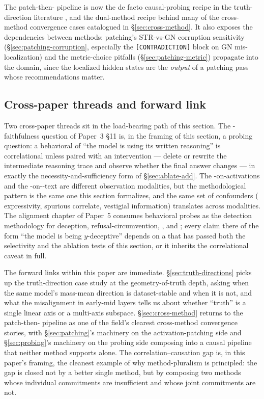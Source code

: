 The patch-then- pipeline is now the de facto causal-probing
recipe in the truth-direction literature
\citep{marks-tegmark-2023-truth}, and the dual-method recipe behind
many of the cross-method convergence cases catalogued in
\S\ref{sec:cross-method}. It also exposes the dependencies between
methods: patching's STR-vs-GN corruption sensitivity
(\S\ref{sec:patching-corruption}, especially the
\texttt{[CONTRADICTION]} block on GN mis-localization) and the
metric-choice pitfalls (\S\ref{sec:patching-metric}) propagate into
the  domain, since the localized hidden states are the
\emph{output} of a patching pass whose recommendations matter.

\subsection{Cross-paper threads and forward link}
\label{sec:correlation-causation-forward}

Two cross-paper threads sit in the load-bearing path of this section.
The -faithfulness question of Paper~3 \S 11 is, in
the framing of this section, a probing question: a behavioral 
of ``the model is using its written reasoning'' is correlational
unless paired with an intervention --- delete or rewrite the
intermediate reasoning trace and observe whether the final answer
changes --- in exactly the necessity-and-sufficiency form of
\S\ref{sec:ablate-add}. The -on-activations and the
-on--text are different observation modalities, but the
methodological pattern is the same one this section formalizes, and
the same set of confounders ( expressivity, spurious correlate,
vestigial information) translates across modalities. The alignment
chapter of Paper~5 consumes behavioral probes as the detection
methodology for deception, refusal-circumvention, , and
; every claim there of the form ``the model is being
$y$-deceptive'' depends on a  that has passed both the
selectivity and the ablation tests of this section, or it inherits
the correlational caveat in full.

The forward links within this paper are immediate.
\S\ref{sec:truth-directions} picks up the truth-direction case study
at the geometry-of-truth depth, asking when the same model's
mass-mean direction is dataset-stable and when it is not, and what
the misalignment in early-mid layers tells us about whether
``truth'' is a single linear axis or a multi-axis subspace.
\S\ref{sec:cross-method} returns to the patch-then- pipeline as
one of the field's clearest cross-method convergence stories, with
\S\ref{sec:patching}'s machinery on the activation-patching side
and \S\ref{sec:probing}'s machinery on the probing side composing
into a causal pipeline that neither method supports alone. The
correlation--causation gap is, in this paper's framing, the cleanest
example of why method-pluralism is principled: the gap is closed not
by a better single method, but by composing two methods whose
individual commitments are insufficient and whose joint commitments
are not.
